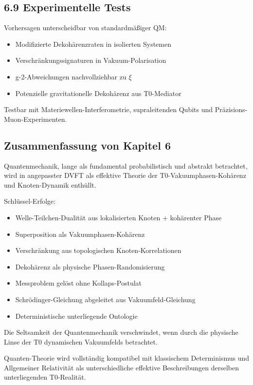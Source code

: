 	\subsection{6.9 Experimentelle Tests}
	
	Vorhersagen unterscheidbar von standardmäßiger QM:
	\begin{itemize}
		\item Modifizierte Dekohärenzraten in isolierten Systemen
		\item Verschränkungssignaturen in Vakuum-Polarisation
		\item g-2-Abweichungen nachvollziehbar zu $\xi$
		\item Potenzielle gravitationelle Dekohärenz aus T0-Mediator
	\end{itemize}
	
	Testbar mit Materiewellen-Interferometrie, supraleitenden Qubits und Präzisions-Muon-Experimenten.
	
	\subsection{Zusammenfassung von Kapitel 6}
	
	Quantenmechanik, lange als fundamental probabilistisch und abstrakt betrachtet, wird in angepasster DVFT als effektive Theorie der T0-Vakuumphasen-Kohärenz und Knoten-Dynamik enthüllt.
	
	Schlüssel-Erfolge:
	\begin{itemize}
		\item Welle-Teilchen-Dualität aus lokalisierten Knoten + kohärenter Phase
		\item Superposition als Vakuumphasen-Kohärenz
		\item Verschränkung aus topologischen Knoten-Korrelationen
		\item Dekohärenz als physische Phasen-Randomisierung
		\item Messproblem gelöst ohne Kollaps-Postulat
		\item Schrödinger-Gleichung abgeleitet aus Vakuumfeld-Gleichung
		\item Deterministische unterliegende Ontologie
	\end{itemize}
	
	Die Seltsamkeit der Quantenmechanik verschwindet, wenn durch die physische Linse der T0 dynamischen Vakuumfelds betrachtet.
	
	Quanten-Theorie wird vollständig kompatibel mit klassischem Determinismus und Allgemeiner Relativität als unterschiedliche effektive Beschreibungen derselben unterliegenden T0-Realität.
	
